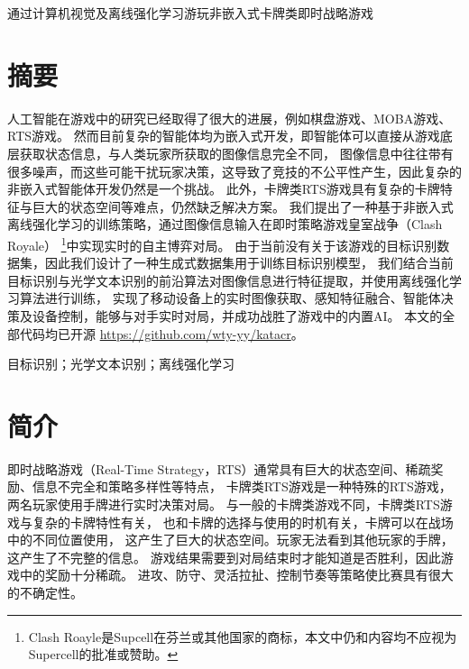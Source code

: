 \documentclass[openany,twoside,nofonts,AutoFakeBold,UTF8]{ctexbook}
\begin{document}

\begin{center}\Large
通过计算机视觉及离线强化学习游玩非嵌入式卡牌类即时战略游戏
\end{center}
\section{摘要}
人工智能在游戏中的研究已经取得了很大的进展，例如棋盘游戏、MOBA游戏、RTS游戏。
然而目前复杂的智能体均为嵌入式开发，即智能体可以直接从游戏底层获取状态信息，与人类玩家所获取的图像信息完全不同，
图像信息中往往带有很多噪声，而这些可能干扰玩家决策，这导致了竞技的不公平性产生，因此复杂的非嵌入式智能体开发仍然是一个挑战。
此外，卡牌类RTS游戏具有复杂的卡牌特征与巨大的状态空间等难点，仍然缺乏解决方案。
我们提出了一种基于非嵌入式离线强化学习的训练策略，通过图像信息输入在即时策略游戏皇室战争（Clash Royale）
\footnote{Clash Roayle是Supcell在芬兰或其他国家的商标，本文中仍和内容均不应视为Supercell的批准或赞助。}中实现实时的自主博弈对局。
由于当前没有关于该游戏的目标识别数据集，因此我们设计了一种生成式数据集用于训练目标识别模型，
我们结合当前目标识别与光学文本识别的前沿算法对图像信息进行特征提取，并使用离线强化学习算法进行训练，
实现了移动设备上的实时图像获取、感知特征融合、智能体决策及设备控制，能够与对手实时对局，并成功战胜了游戏中的内置AI。
本文的全部代码均已开源 \url{https://github.com/wty-yy/katacr}。

 目标识别；光学文本识别；离线强化学习

\section{简介}
即时战略游戏（Real-Time Strategy，RTS）通常具有巨大的状态空间、稀疏奖励、信息不完全和策略多样性等特点，
卡牌类RTS游戏是一种特殊的RTS游戏，两名玩家使用手牌进行实时决策对局。
与一般的卡牌类游戏不同，卡牌类RTS游戏与复杂的卡牌特性有关，
也和卡牌的选择与使用的时机有关，卡牌可以在战场中的不同位置使用，
这产生了巨大的状态空间。玩家无法看到其他玩家的手牌，这产生了不完整的信息。
游戏结果需要到对局结束时才能知道是否胜利，因此游戏中的奖励十分稀疏。
进攻、防守、灵活拉扯、控制节奏等策略使比赛具有很大的不确定性。
\end{document}
